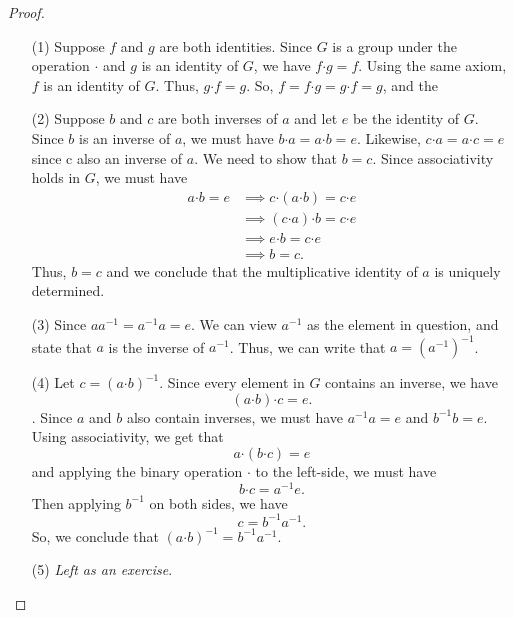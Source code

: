 \begin{proof}
\begin{enumerate}
    \item[(1)] Suppose \( f  \) and \( g  \) are both identities. Since \( G  \) is a group under the operation \( \boldsymbol{\cdot}  \) and \( g  \) is an identity of \( G  \), we have \( f \boldsymbol{\cdot} g = f  \). Using the same axiom, \(  f  \) is an identity of \( G  \). Thus, \( g \boldsymbol{\cdot} f = g   \). So, \( f =  f \boldsymbol{\cdot} g = g \boldsymbol{\cdot} f = g   \), and the 
    \item[(2)] Suppose \( b  \) and \( c  \) are both inverses of \( a  \) and let \( e  \) be the identity of \( G  \). Since \( b  \) is an inverse of \( a \), we must have \( b \boldsymbol{\cdot} a =  a \boldsymbol{\cdot} b = e  \). Likewise, \( c \boldsymbol{\cdot} a = a \boldsymbol{\cdot} c = e   \) since c also an inverse of \( a  \). We need to show that \( b = c  \). Since associativity holds in \( G  \), we must have
        \begin{align*}
            a \boldsymbol{\cdot} b = e &\implies c \boldsymbol{\cdot} (a \boldsymbol{\cdot} b ) = c \boldsymbol{\cdot} e  \\
                                       &\implies ( c \boldsymbol{\cdot} a ) \boldsymbol{\cdot} b = c \boldsymbol{\cdot} e \\ 
                                       &\implies e \boldsymbol{\cdot} b = c \boldsymbol{\cdot} e \\
                                       &\implies b = c.
        \end{align*}
        Thus, \( b = c   \) and we conclude that the multiplicative identity of \( a  \) is uniquely determined.
    \item[(3)] Since \( a a^{-1} = a^{-1} a = e  \). We can view \( a^{-1} \) as the element in question, and state that \( a  \) is the inverse of \( a^{-1} \). Thus, we can write that \( a = (a^{-1})^{-1}  \).
    \item[(4)] Let \( c = (a \boldsymbol{\cdot} b)^{-1} \). Since every element in \( G  \) contains an inverse, we have \[ (a \boldsymbol{\cdot} b) \boldsymbol{\cdot} c = e.  \tag{1}   \]. 
        Since \( a  \) and \( b  \) also contain inverses, we must have \( a^{-1} a = e  \) and \( b^{-1} b = e  \). Using associativity, we get that 
        \[ a \boldsymbol{\cdot} ( b \boldsymbol{\cdot} c ) = e   \] and
        applying the binary operation \( \boldsymbol{\cdot}  \) to the left-side, we must have 
        \[  b \boldsymbol{\cdot} c = a^{-1} e. \]
        Then applying \( b^{-1} \) on both sides, we have
        \[   c = b^{-1} a^{-1}. \]
        So, we conclude that \( (a \boldsymbol{\cdot} b)^{-1} = b^{-1} a^{-1} \).
    \item[(5)] \textit{Left as an exercise}. 
\end{enumerate}
\end{proof}

